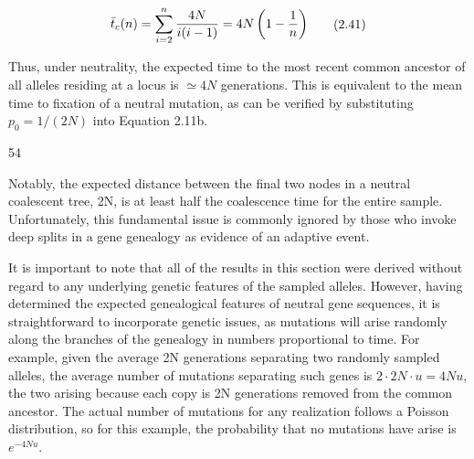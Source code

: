 \documentclass{article}
\begin{document}
\begin{equation}
\begin{align*}\bar t_c(n)=\sum_{i=2}^n{4N\over i(i-1)}=4N\left(1-{1\over n}\right)\end{align*}
\tag{2.41}
\label{eq:2_41}
\end{equation}

Thus, under neutrality, the expected time to the most recent common ancestor of all alleles residing at a locus is  $ \simeq 4N $ generations. This is equivalent to the mean time to fixation of a neutral mutation, as can be verified by substituting  $ p_0 = 1/(2N) $ into Equation 2.11b.

54

Notably, the expected distance between the final two nodes in a neutral coalescent tree, 2N, is at least half the coalescence time for the entire sample. Unfortunately, this fundamental issue is commonly ignored by those who invoke deep splits in a gene genealogy as evidence of an adaptive event.

It is important to note that all of the results in this section were derived without regard to any underlying genetic features of the sampled alleles. However, having determined the expected genealogical features of neutral gene sequences, it is straightforward to incorporate genetic issues, as mutations will arise randomly along the branches of the genealogy in numbers proportional to time. For example, given the average 2N generations separating two randomly sampled alleles, the average number of mutations separating such genes is  $ 2 \cdot 2N \cdot u = 4Nu $, the two arising because each copy is 2N generations removed from the common ancestor. The actual number of mutations for any realization follows a Poisson distribution, so for this example, the probability that no mutations have arise is  $ e^{-4Nu} $.
\end{document}

